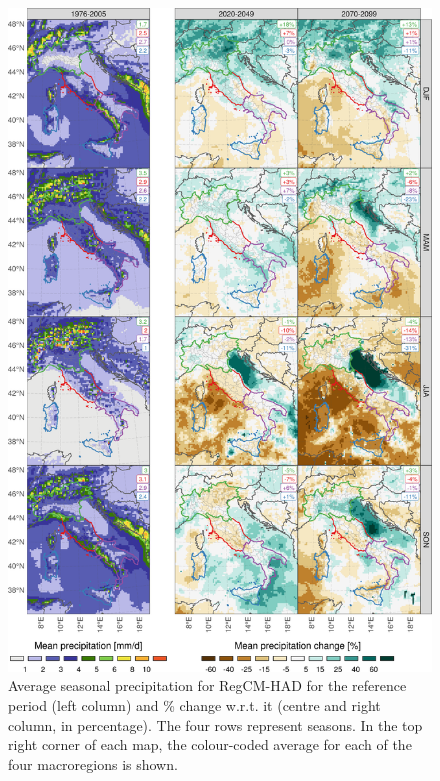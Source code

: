 \begin{figure}
    \centering
    \includegraphics[width=\textwidth]{figures/change_rcm/pr/meanpctl_change_3col}
    \decoRule
    \caption[Projected change of average seasonal precipitation]{
        Average seasonal precipitation for RegCM-HAD for the reference period (left column) and \% change w.r.t. it (centre and right column, in percentage). The four rows represent seasons. In the top right corner of each map, the colour-coded average for each of the four macroregions is shown.
    } \label{fig:change_rcm_pr_mean}
\end{figure}

